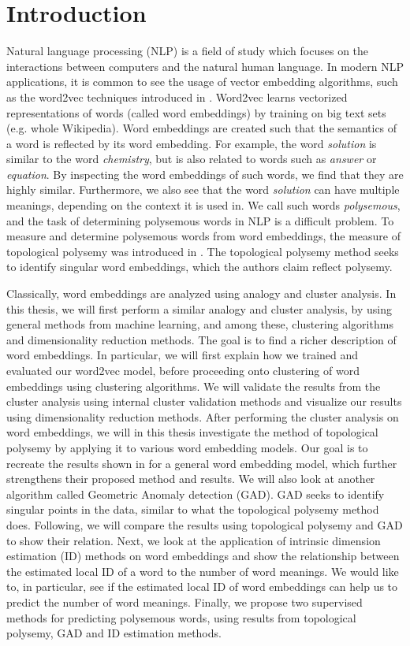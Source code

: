 \chapter{Introduction}
\label{chap:introduction}
Natural language processing (NLP) is a field of study which focuses on the interactions between computers and the natural human language. In modern NLP applications, it is common to see the usage of vector embedding algorithms, such as the word2vec techniques introduced in \cite{mikolov2013a}. Word2vec learns vectorized representations of words (called word embeddings) by training on big text sets (e.g. whole Wikipedia). Word embeddings are created such that the semantics of a word is reflected by its word embedding. For example, the word \textit{solution} is similar to the word \textit{chemistry}, but is also related to words such as \textit{answer} or \textit{equation}. By inspecting the word embeddings of such words, we find that they are highly similar. Furthermore, we also see that the word \textit{solution} can have multiple meanings, depending on the context it is used in. We call such words \textit{polysemous}, and the task of determining polysemous words in NLP is a difficult problem. To measure and determine polysemous words from word embeddings, the measure of topological polysemy was introduced in \cite{jakubowski2020topology}. The topological polysemy method seeks to identify singular word embeddings, which the authors claim reflect polysemy.

Classically, word embeddings are analyzed using analogy and cluster analysis. In this thesis, we will first perform a similar analogy and cluster analysis, by using general methods from machine learning, and among these, clustering algorithms and dimensionality reduction methods. The goal is to find a richer description of word embeddings. In particular, we will first explain how we trained and evaluated our word2vec model, before proceeding onto clustering of word embeddings using clustering algorithms. We will validate the results from the cluster analysis using internal cluster validation methods and visualize our results using dimensionality reduction methods. After performing the cluster analysis on word embeddings, we will in this thesis investigate the method of topological polysemy by applying it to various word embedding models. Our goal is to recreate the results shown in \cite{jakubowski2020topology} for a general word embedding model, which further strengthens their proposed method and results. We will also look at another algorithm called Geometric Anomaly detection (GAD). GAD seeks to identify singular points in the data, similar to what the topological polysemy method does. Following, we will compare the results using topological polysemy and GAD to show their relation. Next, we look at the application of intrinsic dimension estimation (ID) methods on word embeddings and show the relationship between the estimated local ID of a word to the number of word meanings. We would like to, in particular, see if the estimated local ID of word embeddings can help us to predict the number of word meanings. Finally, we propose two supervised methods for predicting polysemous words, using results from topological polysemy, GAD and ID estimation methods.

